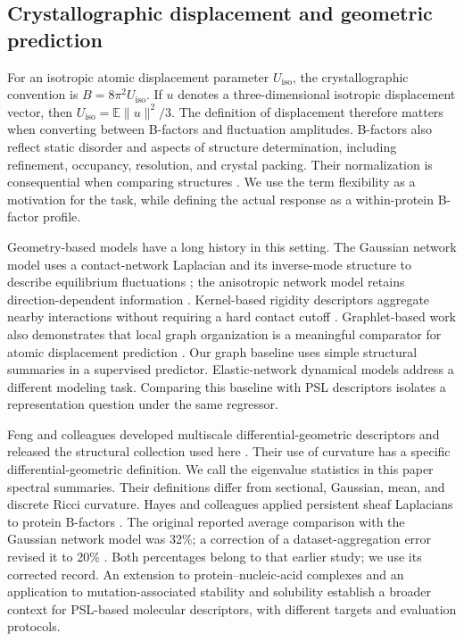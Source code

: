 \documentclass[11pt]{article}
\begin{document}
\subsection{Crystallographic displacement and geometric prediction}
For an isotropic atomic displacement parameter $U_{\mathrm{iso}}$, the crystallographic convention is $B=8\pi^2 U_{\mathrm{iso}}$. If $u$ denotes a three-dimensional isotropic displacement vector, then $U_{\mathrm{iso}}=\mathbb{E}\|u\|^2/3$. The definition of displacement therefore matters when converting between B-factors and fluctuation amplitudes. B-factors also reflect static disorder and aspects of structure determination, including refinement, occupancy, resolution, and crystal packing. Their normalization is consequential when comparing structures \citep{carugo2018}. We use the term flexibility as a motivation for the task, while defining the actual response as a within-protein B-factor profile.

Geometry-based models have a long history in this setting. The Gaussian network model uses a contact-network Laplacian and its inverse-mode structure to describe equilibrium fluctuations \citep{haliloglu1997}; the anisotropic network model retains direction-dependent information \citep{atilgan2001}. Kernel-based rigidity descriptors aggregate nearby interactions without requiring a hard contact cutoff \citep{nguyen2016}. Graphlet-based work also demonstrates that local graph organization is a meaningful comparator for atomic displacement prediction \citep{praznikar2023}. Our graph baseline uses simple structural summaries in a supervised predictor. Elastic-network dynamical models address a different modeling task. Comparing this baseline with PSL descriptors isolates a representation question under the same regressor.

Feng and colleagues developed multiscale differential-geometric descriptors and released the structural collection used here \citep{feng2025}. Their use of curvature has a specific differential-geometric definition. We call the eigenvalue statistics in this paper spectral summaries. Their definitions differ from sectional, Gaussian, mean, and discrete Ricci curvature. Hayes and colleagues applied persistent sheaf Laplacians to protein B-factors \citep{hayes2025}. The original reported average comparison with the Gaussian network model was 32\%; a correction of a dataset-aggregation error revised it to 20\% \citep{hayes2025correction}. Both percentages belong to that earlier study; we use its corrected record. An extension to protein--nucleic-acid complexes \citep{hayes2026} and an application to mutation-associated stability and solubility \citep{ren2026} establish a broader context for PSL-based molecular descriptors, with different targets and evaluation protocols.
\end{document}
